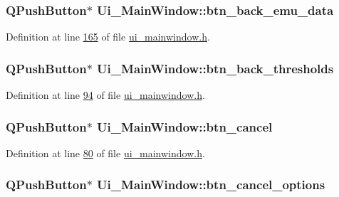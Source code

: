\hypertarget{a00080_ab6199bde688a9b2e91e192278190dda7}{
\subsubsection[{btn\+\_\+back\+\_\+emu\+\_\+data}]{\setlength{\rightskip}{0pt plus 5cm}Q\+Push\+Button$\ast$ Ui\+\_\+\+Main\+Window\+::btn\+\_\+back\+\_\+emu\+\_\+data}}\label{a00080_ab6199bde688a9b2e91e192278190dda7}


Definition at line \hyperlink{a00139_source_l00165}{165} of file \hyperlink{a00139_source}{ui\+\_\+mainwindow.\+h}.

\hypertarget{a00080_a5a4e0ac94bd22955cc41bcc276a04278}{
\subsubsection[{btn\+\_\+back\+\_\+thresholds}]{\setlength{\rightskip}{0pt plus 5cm}Q\+Push\+Button$\ast$ Ui\+\_\+\+Main\+Window\+::btn\+\_\+back\+\_\+thresholds}}\label{a00080_a5a4e0ac94bd22955cc41bcc276a04278}


Definition at line \hyperlink{a00139_source_l00094}{94} of file \hyperlink{a00139_source}{ui\+\_\+mainwindow.\+h}.

\hypertarget{a00080_a26ea4040157d183322b8c1e5d7a55c9f}{
\subsubsection[{btn\+\_\+cancel}]{\setlength{\rightskip}{0pt plus 5cm}Q\+Push\+Button$\ast$ Ui\+\_\+\+Main\+Window\+::btn\+\_\+cancel}}\label{a00080_a26ea4040157d183322b8c1e5d7a55c9f}


Definition at line \hyperlink{a00139_source_l00080}{80} of file \hyperlink{a00139_source}{ui\+\_\+mainwindow.\+h}.

\hypertarget{a00080_a39d7e34aed8750622569f0819dd7c8c2}{
\subsubsection[{btn\+\_\+cancel\+\_\+options}]{\setlength{\rightskip}{0pt plus 5cm}Q\+Push\+Button$\ast$ Ui\+\_\+\+Main\+Window\+::btn\+\_\+cancel\+\_\+options}}\label{a00080_a39d7e34aed8750622569f0819dd7c8c2}


